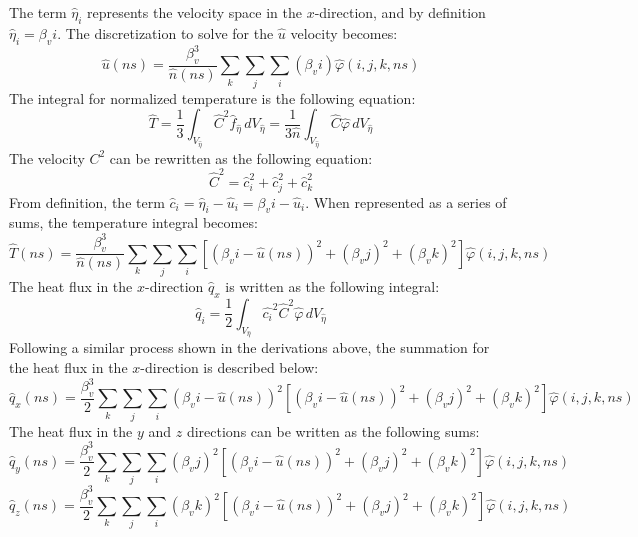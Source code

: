 \documentclass[a4paper]{article}
\begin{document}
The term $\hat{\eta}_i$ represents the velocity space in the $x$-direction, and by definition $\hat{\eta}_i = \beta_v i$. The discretization to solve for the $\hat{u}$ velocity becomes:
\begin{equation}
    \hat{u}(ns) = \dfrac{\beta_v^3}{\hat{n}(ns)} \sum_k \sum_j \sum_i (\beta_v i)\hat{\varphi}(i,j,k,ns) 
\end{equation}
The integral for normalized temperature is the following equation:
\begin{equation}
    \hat{T} = \dfrac{1}{3} \int_{V_{\hat{\eta}}} \hat{C}^2 \hat{f}_{\hat{\eta}} \,dV_{\hat{\eta}} = \dfrac{1}{3\hat{n}} \int_{V_{\hat{\eta}}} \hat{C} \hat{\varphi} \,dV_{\hat{\eta}}
\end{equation}
The velocity $C^2$ can be rewritten as the following equation:
\begin{equation}
    \hat{C}^2 = \hat{c}_i^2 + \hat{c}_j^2 + \hat{c}_k^2 
\end{equation}
From definition, the term $\hat{c}_i = \hat{\eta}_i - \hat{u}_i = \beta_v i -\hat{u}_i $. When represented as a series of sums, the temperature integral becomes:
\begin{equation}
    \hat{T}(ns) = \dfrac{\beta_v^3}{\hat{n}(ns)} \sum_k \sum_j \sum_i \left[(\beta_v i - \hat{u}(ns))^2 + (\beta_v j)^2 + (\beta_v k)^2 \right]\hat{\varphi}(i,j,k,ns)
\end{equation}
The heat flux in the $x$-direction $\hat{q}_x$ is written as the following integral:
\begin{equation}
    \hat{q}_i = \dfrac{1}{2} \int_{V_{\hat{\eta}}} \hat{c_i}^2\hat{C}^2 \hat{\varphi} \,dV_{\hat{\eta}}
\end{equation}
Following a similar process shown in the derivations above, the summation for the heat flux in the $x$-direction is described below:
\begin{equation}
    \hat{q}_x(ns) = \dfrac{\beta_v^3}{2} \sum_k \sum_j \sum_i (\beta_v i - \hat{u}(ns))^2\left[(\beta_v i - \hat{u}(ns))^2 + (\beta_v j)^2 + (\beta_v k)^2 \right]\hat{\varphi}(i,j,k,ns)
\end{equation}
The heat flux in the $y$ and $z$ directions can be written as the following sums:
\begin{equation}
    \hat{q}_y(ns) = \dfrac{\beta_v^3}{2} \sum_k \sum_j \sum_i (\beta_v j)^2\left[(\beta_v i - \hat{u}(ns))^2 + (\beta_v j)^2 + (\beta_v k)^2 \right]\hat{\varphi}(i,j,k,ns)
\end{equation}
\begin{equation}
    \hat{q}_z(ns) = \dfrac{\beta_v^3}{2} \sum_k \sum_j \sum_i (\beta_v k)^2\left[(\beta_v i - \hat{u}(ns))^2 + (\beta_v j)^2 + (\beta_v k)^2 \right]\hat{\varphi}(i,j,k,ns)
\end{equation}
\end{document}
